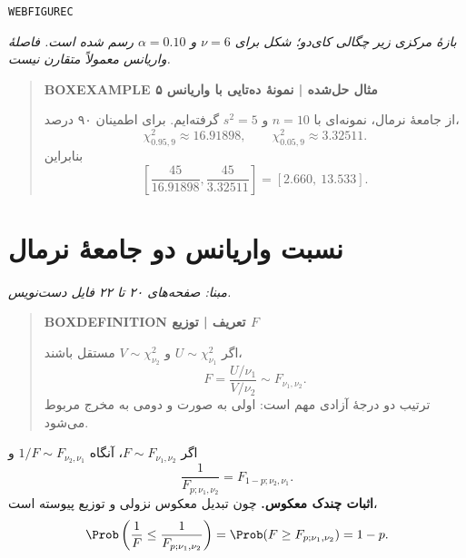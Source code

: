 \texttt{WEBFIGUREC}


\textit{بازهٔ مرکزی زیر چگالی کای‌دو؛ شکل برای $\nu=6$ و $\alpha=0.10$ رسم شده است. فاصلهٔ واریانس معمولاً متقارن نیست.}\par 

\begin{quote}\textbf{BOXEXAMPLE مثال حل‌شده | نمونهٔ ده‌تایی با واریانس ۵}\par 
از جامعهٔ نرمال، نمونه‌ای با $n=10$ و $s^2=5$ گرفته‌ایم. برای اطمینان ۹۰ درصد،
\[
\chi^2_{0.95,9}\approx16.91898,\qquad
\chi^2_{0.05,9}\approx3.32511.
\]
بنابراین
\[
\left[\frac{45}{16.91898},\frac{45}{3.32511}\right]
=\boxed{[2.660,\ 13.533]}.
\]
\end{quote}
\section{نسبت واریانس دو جامعهٔ نرمال}
\textit{مبنا: صفحه‌های ۲۰ تا ۲۲ فایل دست‌نویس.}\par 
\begin{quote}\textbf{BOXDEFINITION تعریف | توزیع $F$}\par 
اگر $U\sim\chi^2_{\nu_1}$ و $V\sim\chi^2_{\nu_2}$ مستقل باشند،
\[
F=\frac{U/\nu_1}{V/\nu_2}\sim F_{\nu_1,\nu_2}.
\]
ترتیب دو درجهٔ آزادی مهم است: اولی به صورت و دومی به مخرج مربوط می‌شود.
\end{quote}
اگر $F\sim F_{\nu_1,\nu_2}$، آنگاه $1/F\sim F_{\nu_2,\nu_1}$ و
\[
\boxed{\frac1{F_{p;\nu_1,\nu_2}}=F_{1-p;\nu_2,\nu_1}.}
\]
\textbf{اثبات چندک معکوس.} چون تبدیل معکوس نزولی و توزیع پیوسته است،
\[
\Prob\left(\frac1F\le\frac1{F_{p;\nu_1,\nu_2}}\right)
=\Prob(F\ge F_{p;\nu_1,\nu_2})=1-p.
\]
